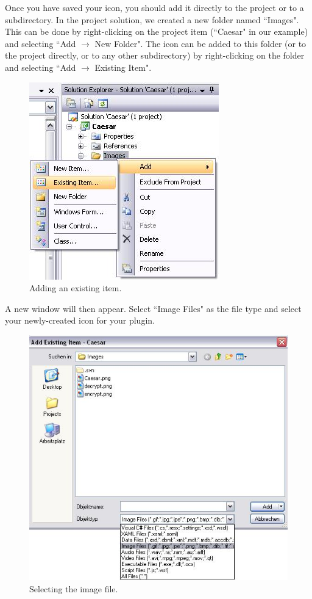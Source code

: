 Once you have saved your icon, you should add it directly to the project or to a subdirectory. In the project solution, we created a new folder named ``Images". This can be done by right-clicking on the project item (``Caesar" in our example) and selecting ``Add $\rightarrow$ New Folder". The icon can be added to this folder (or to the project directly, or to any other subdirectory) by right-clicking on the folder and selecting ``Add $\rightarrow$ Existing Item".

\begin{figure}[h!]
	\centering
		\includegraphics{figures/add_existing_item.jpg}
	\caption{Adding an existing item.}
	\label{fig:add_existing_item}
\end{figure}
\clearpage

A new window will then appear. Select ``Image Files" as the file type and select your newly-created icon for your plugin.

\begin{figure}[h!]
	\centering
		\includegraphics{figures/choose_icon.jpg}
	\caption{Selecting the image file.}
	\label{fig:choose_icon}
\end{figure}
\clearpage

